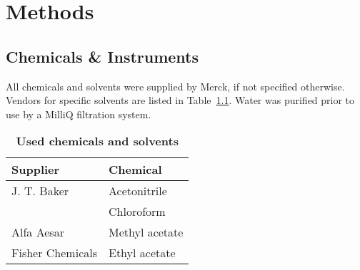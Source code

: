 \chapter{Methods}

\section{Chemicals \& Instruments} %
\label{sec:chemicals_&_instruments}

	All chemicals and solvents were supplied by Merck, if not specified otherwise.
	Vendors for specific solvents are listed in Table~\ref{tab:solvent_table}.
	Water was purified prior to use by a MilliQ filtration system.

	\begin{table}[htbp]
		\caption[Used chemicals and solvents]{%
			\textbf{Used chemicals and solvents}}
		\label{tab:solvent_table}
		\centering
		\begin{tabularx}{\textwidth}{XX}
			\toprule
			\textbf{Supplier}	&	\textbf{Chemical}	\\
			\midrule
			J. T. Baker			&	Acetonitrile		\\
								&	Chloroform			\\
			Alfa Aesar			&	Methyl acetate		\\
			Fisher Chemicals 	&	Ethyl acetate		\\
		\end{tabularx}
	\end{table}




